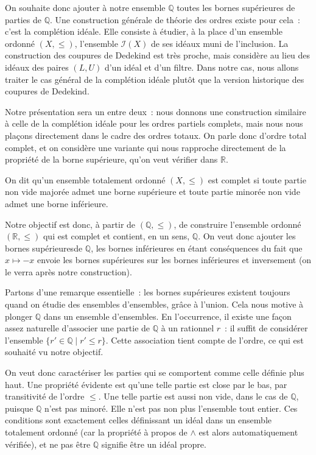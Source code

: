 On souhaite donc ajouter à notre ensemble $\mathbb Q$ toutes les bornes
supérieures de parties de $\mathbb Q$. Une construction générale de théorie des
ordres existe pour cela~: c'est la complétion idéale. Elle consiste à étudier,
à la place d'un ensemble ordonné $(X,\leq)$, l'ensemble $\mathcal I(X)$ de ses
idéaux muni de l'inclusion. La construction des coupures de Dedekind est très
proche, mais considère au lieu des idéaux des paires $(L,U)$ d'un idéal et d'un
filtre. Dans notre cas, nous allons traiter le cas général de la complétion
idéale plutôt que la version historique des coupures de Dedekind.

Notre présentation sera un entre deux~: nous donnons une construction
similaire à celle de la complétion idéale pour les ordres partiels complets,
mais nous nous plaçons directement dans le cadre des ordres totaux. On parle
donc d'ordre total complet, et on considère une variante qui nous rapproche
directement de la propriété de la borne supérieure, qu'on veut vérifier dans
$\mathbb R$.

\begin{definition}
  On dit qu'un ensemble totalement ordonné $(X,\leq)$ est complet si toute
  partie non vide majorée admet une borne supérieure et toute partie minorée
  non vide admet une borne inférieure.
\end{definition}

Notre objectif est donc, à partir de $(\mathbb Q,\leq)$, de construire
l'ensemble ordonné $(\mathbb R,\leq)$ qui est complet et contient, en un sens,
$\mathbb Q$. On veut donc \og ajouter les bornes supérieures\fg de $\mathbb Q$,
les bornes inférieures en étant conséquences du fait que $x\mapsto -x$ envoie
les bornes supérieures sur les bornes inférieures et inversement (on le verra
après notre construction).

Partons d'une remarque essentielle~: les bornes supérieures existent toujours
quand on étudie des ensembles d'ensembles, grâce à l'union. Cela nous motive à
plonger $\mathbb Q$ dans un ensemble d'ensembles. En l'occurrence, il existe une
façon assez naturelle d'associer une partie de $\mathbb Q$ à un rationnel $r$~:
il suffit de considérer l'ensemble $\{r' \in \mathbb Q \mid r' \leq r\}$. Cette
association tient compte de l'ordre, ce qui est souhaité vu notre objectif.

On veut donc caractériser les parties qui se comportent comme celle définie plus
haut. Une propriété évidente est qu'une telle partie est close par le bas, par
transitivité de l'ordre $\leq$. Une telle partie est aussi non vide, dans le cas
de $\mathbb Q$, puisque $\mathbb Q$ n'est pas minoré. Elle n'est pas non plus
l'ensemble tout entier. Ces conditions sont exactement celles définissant un
idéal dans un ensemble totalement ordonné (car la propriété à propos de $\land$
est alors automatiquement vérifiée), et ne pas être $\mathbb Q$ signifie être un
idéal propre.

